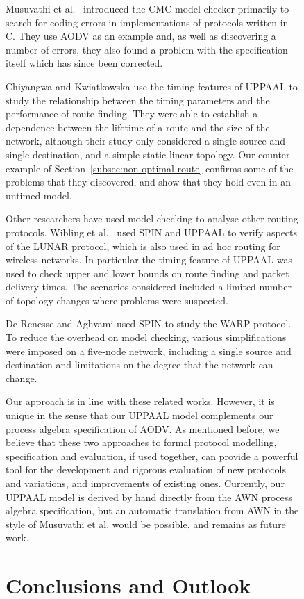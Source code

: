 \documentclass[conference,twoside]{IEEEtran}
\newcommand{\awn}{AWN\xspace}
\begin{document}
\begin{figure}[h]
{\begin{minipage}{0.6\linewidth}
Musuvathi et al.\ \cite{MPCED02}  introduced the CMC  model checker
primarily to search for coding errors in implementations of protocols
written in C\@. They use AODV as an example and, as well as discovering
a number of errors, they also found a problem with the specification
itself which has since been corrected.

 Chiyangwa and Kwiatkowska \cite{CK05} use the timing features of
 UPPAAL to study the relationship between the timing parameters and
 the performance of route finding. They were able to establish  a
 dependence between the lifetime of a route and the size of the network, although their study only considered a  single source and single destination, and a simple static linear topology. Our counter-example of Section~\ref{subsec:non-optimal-route} confirms some of the problems that they discovered, and show that they hold even in an untimed model.

 Other researchers have used model checking to analyse other routing protocols. Wibling et al.\ \cite{WPP04} used  SPIN and UPPAAL to verify aspects of the LUNAR protocol, which is also used in ad hoc routing for wireless networks. In particular the timing feature of UPPAAL was used to check upper and lower bounds on route finding and packet delivery times. The scenarios considered included a limited number of topology changes where problems were suspected.

De Renesse and Aghvami \cite{RA04} used SPIN  to study the WARP protocol.  To reduce the overhead on model checking, various simplifications were imposed on a five-node network, including a single source and destination and limitations on the degree that the network can change.

Our approach is in line with these related works.
However, it is unique in the sense that our UPPAAL model complements
our process algebra specification of AODV. As mentioned before, we believe that these two approaches to formal protocol modelling, specification and evaluation, if used together,
can provide a powerful tool for the development and rigorous evaluation of new protocols and variations, and improvements of existing ones.
Currently, our UPPAAL model is derived by hand directly from the \awn process algebra specification, but an automatic translation from \awn in the style of
Musuvathi et al. \cite{MPCED02} would be possible, and remains as future work.


\vspace{1.4pt}
\section{Conclusions and Outlook}\label{sec:conclude}
\vspace{1.4pt}


\end{minipage}}
\end{figure}
\end{document}
